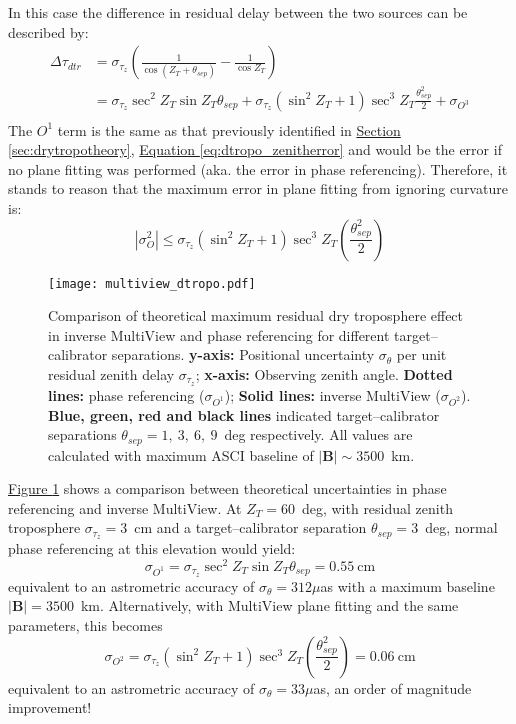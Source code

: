 		In this case the difference in residual delay between the two sources can be described by:
		\begin{equation}
			\begin{split}
			\Delta\tau_{dtr}&=\sigma_{\tau_z} \left(\frac{1}{\cos\left(Z_T+\theta_{sep}\right)}-\frac{1}{\cos Z_T}\right) \\
							&=\sigma_{\tau_z}\sec^2 Z_T\sin Z_T \theta_{sep} + \sigma_{\tau_z}\left(\sin^2 Z_T + 1\right)\sec^3 Z_T \frac{\theta_{sep}^2}{2}+\sigma_{O^3}\\ 
			\end{split}
			\label{eq:troposzenith}
		\end{equation} The $O^1$ term is the same as that previously identified in \hyperref[sec:drytropotheory]{Section \ref*{sec:drytropotheory}}, \hyperref[eq:dtropo_zenitherror]{Equation \ref*{eq:dtropo_zenitherror}} and would be the error if no plane fitting was performed (aka. the error in phase referencing). Therefore, it stands to reason that the maximum error in plane fitting from ignoring curvature is:
		\begin{equation}
			|\sigma_O^2| \le \sigma_{\tau_z}\left(\sin^2 Z_T + 1\right)\sec^3 Z_T \left(\frac{\theta_{sep}^2}{2}\right)
		\end{equation} 
		
		\begin{figure}[h]
			\centering
			\texttt{[image: multiview\_dtropo.pdf]}
			\caption[Positional Tropospheric Error]{Comparison of theoretical maximum residual dry troposphere effect in inverse MultiView and phase referencing for different target--calibrator separations. \textbf{y-axis:} Positional uncertainty $\sigma_\theta$ per unit residual zenith delay $\sigma_{\tau_z}$; \textbf{x-axis:} Observing zenith angle. \textbf{Dotted lines:} phase referencing ($\sigma_{O^1}$); \textbf{Solid lines:} inverse MultiView ($\sigma_{O^2}$). \textbf{Blue, green, red and black lines} indicated target--calibrator separations $\theta_{sep}=1,~3,~6,~9$~deg respectively. All values are calculated with maximum ASCI baseline of $|\textbf{B}|\sim3500$~km.} \label{fig:multiviewtropos}
		\end{figure}
		
		\hyperref[fig:multiviewtropos]{Figure \ref*{fig:multiviewtropos}} shows a comparison between theoretical uncertainties in phase referencing and inverse MultiView. At $Z_T=60$~deg, with residual zenith troposphere $\sigma_{\tau_z}=3$~cm and a target--calibrator separation $\theta_{sep}=3$~deg, normal phase referencing at this elevation would yield: $$\sigma_{O^1} = \sigma_{\tau_z}\sec^2 Z_T\sin Z_T \theta_{sep} = 0.55~\text{cm}$$ equivalent to an astrometric accuracy of $\sigma_\theta=312\mu$as with a maximum baseline $|\textbf{B}|=3500$~km. Alternatively, with MultiView plane fitting and the same parameters, this becomes $$\sigma_{O^2}=\sigma_{\tau_z}\left(\sin^2 Z_T + 1\right)\sec^3 Z_T \left(\frac{\theta_{sep}^2}{2}\right)=0.06~\text{cm}$$ equivalent to an astrometric accuracy of $\sigma_\theta=33\mu$as, an order of magnitude improvement! 
		
